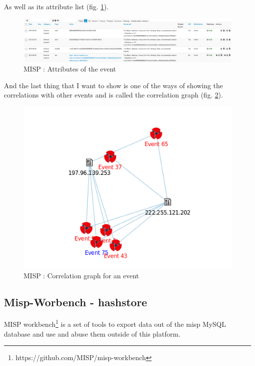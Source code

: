 \documentclass{eplmastersthesis}
\begin{document}
As well as its attribute list (fig. \ref{webattributes}).
\begin{figure}[!h]
	\begin{center}
		\includegraphics[scale=0.35]{res/webAttributes}
		\caption{MISP : Attributes of the event}
		\label{webattributes}
	\end{center}
\end{figure}

And the last thing that I want to show is one of the ways of showing the correlations with other events and is called the correlation graph (fig. \ref{webcorrelation}).
\begin{figure}[!h]
	\begin{center}
		\includegraphics[scale=0.35]{res/webCorrelationGraph}
		\caption{MISP : Correlation graph for an event}
		\label{webcorrelation}
	\end{center}
\end{figure}

\subsection{Misp-Worbench - hashstore}

MISP workbench\footnote{https://github.com/MISP/misp-workbench} is a set of tools to export data out of the \gls{misp} MySQL database and use and abuse them outside of this platform.\\
\end{document}
